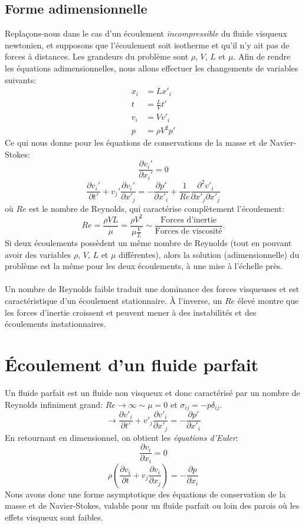 \subsection{Forme adimensionnelle}
Replaçons-nous dans le cas d'un écoulement \emph{incompressible} du fluide visqueux newtonien, et supposons que l'écoulement soit isotherme et qu'il n'y ait pas de forces à distances. Les grandeurs du problème sont $\rho$, $V$, $L$ et $\mu$. Afin de rendre les équations adimensionnelles, nous allons effectuer les changements de variables suivants:
\begin{align*}
x_i&=Lx'_i\\
t&=\frac{L}{V}t'\\
v_i&=Vv'_i\\
p&=\rho V^2 p'
\end{align*}
Ce qui nous donne pour les équations de conservations de la masse et de Navier-Stokes:
$$\frac{\partial v_i'}{\partial x_i'}=0$$
$$\frac{\partial v_i'}{\partial t'}+v_j'\frac{\partial v_i'}{\partial x'_j}=-\frac{\partial p'}{\partial x'_i}+\frac{1}{Re}\frac{\partial^2v'_i}{\partial x'_j\partial x'_j}$$
où $Re$ est le nombre de Reynolds, qui caractérise complètement l'écoulement:
$$Re=\frac{\rho VL}{\mu}=\frac{\rho V^2}{\mu\frac{V}{L}}\sim \frac{\text{Forces d'inertie}}{\text{Forces de viscosité}}.$$ Si deux écoulements possèdent un même nombre de Reynolds (tout en pouvant avoir des variables $\rho$, $V$, $L$ et $\mu$ différentes), alors la solution (adimensionnelle) du problème est la même pour les deux écoulements, à une mise à l'échelle près.
\paragraph{}
Un nombre de Reynolds faible traduit une dominance des forces visqueuses et est caractéristique d'un écoulement stationnaire.  \`A l'inverse, un $Re$ élevé montre que les forces d'inertie croissent et peuvent mener à des instabilités et des écoulements instationnaires.

\section{\'Ecoulement d'un fluide parfait}
Un fluide parfait est un fluide non visqueux et donc caractérisé par un nombre de Reynolds infiniment grand: $Re\rightarrow \infty \sim \mu=0 \text{ et } \sigma_{ij}=-p\delta_{ij}$.
$$\rightarrow\frac{\partial v'_i}{\partial t'}+v'_j\frac{\partial v'_i}{\partial x'_j}=-\frac{\partial p'}{\partial x'_i}$$
En retournant en dimensionnel, on obtient les \emph{équations d'Euler}:
$$\frac{\partial v_i}{\partial x_i}=0$$
$$\rho\left(\frac{\partial v_i}{\partial t}+v_j\frac{\partial v_i}{\partial x_j}\right)=-\frac{\partial p}{\partial x_i}$$ Nous avons donc une forme asymptotique des équations de conservation de la masse et de Navier-Stokes, valable pour un fluide parfait ou loin des parois où les effets visqueux sont faibles.
